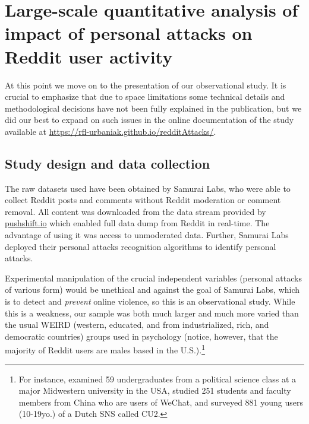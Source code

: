 \documentclass[a4paper,fleqn]{cas-dc}
\begin{document}
\section{Large-scale quantitative analysis of impact of personal attacks on
Reddit user activity}
\label{quantanalysis}


At this point we move on to the presentation of our observational study. It is crucial to emphasize that due to space limitations  some technical details and methodological decisions have not been fully explained in the publication, but we did our best to expand on such issues in the online documentation of the study available at \href{https://rfl-urbaniak.github.io/redditAttacks/}{https://rfl-urbaniak.github.io/redditAttacks/}.


\subsection{Study design and data collection}


The raw datasets used have been obtained by \textsf{Samurai Labs}, who were able to collect \textsf{Reddit} posts and comments without \textsf{Reddit} moderation or comment removal. All content was downloaded from the data stream provided by \url{pushshift.io} which enabled full data dump from Reddit in real-time. The advantage of using it was access to unmoderated data.  Further, \textsf{Samurai Labs} deployed their personal attacks recognition algorithms to identify personal attacks.


Experimental manipulation of the crucial independent variables (personal attacks of various form)  would be unethical and against the goal of \textsf{Samurai Labs}, which is to detect and \emph{prevent} online violence, so this is an observational study. While this  is a weakness, our sample was both much larger and much more varied than the usual WEIRD (western, educated, and from industrialized, rich, and democratic countries) groups used in psychology (notice, however, that the majority of Reddit users  are males based in the U.S.).\footnote{For instance,  \citet{wise2006moderation} examined  59 undergraduates from a political science class at a major Midwestern university in the USA, \citet{zong2019social} studied 251 students and faculty members from China who are users of WeChat, and  \citet{valkenburg2006friend} surveyed  881 young users (10-19yo.) of a Dutch SNS called CU2.}
\end{document}
